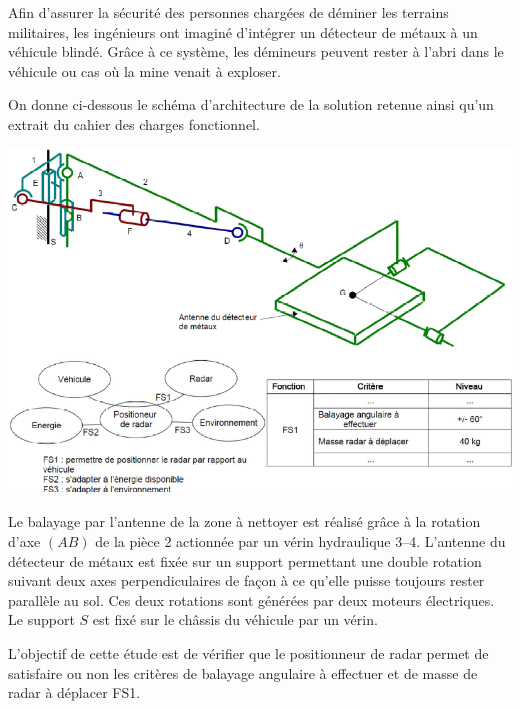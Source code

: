\documentclass[10pt,fleqn]{article} %
\begin{document}

\vspace{7cm}
\pagestyle{fancy}
\thispagestyle{plain}


\def\columnseprulecolor{\color{ocre}}
\setlength{\columnseprule}{0.4pt} 

\begin{multicols}{2}


\ifprof
\else
Afin d'assurer la sécurité des personnes chargées de déminer les terrains militaires, les ingénieurs ont imaginé d'intégrer un détecteur de métaux à un véhicule blindé. Grâce à ce système, les démineurs peuvent rester à l'abri dans le véhicule ou cas où la mine venait à exploser.



On donne ci-dessous le schéma d'architecture de la solution retenue ainsi qu'un extrait du cahier des charges fonctionnel.

\begin{center}
\includegraphics[width=.9\linewidth]{images/img2}
\end{center}

Le balayage par l'antenne de la zone à nettoyer est réalisé grâce à la rotation d'axe $(AB)$ de la pièce 2 actionnée par un vérin hydraulique 3--4. L'antenne du détecteur de métaux est fixée sur un support permettant une double rotation suivant deux axes perpendiculaires de façon à ce qu'elle puisse toujours rester parallèle au sol. Ces deux rotations sont générées par deux moteurs électriques. Le support $S$ est fixé sur le châssis du véhicule par un vérin.

L'objectif de cette étude est de vérifier que le positionneur de radar permet de satisfaire ou non les critères de balayage angulaire à effectuer et de masse de radar à déplacer FS1. 


\end{multicols}
\end{document}

